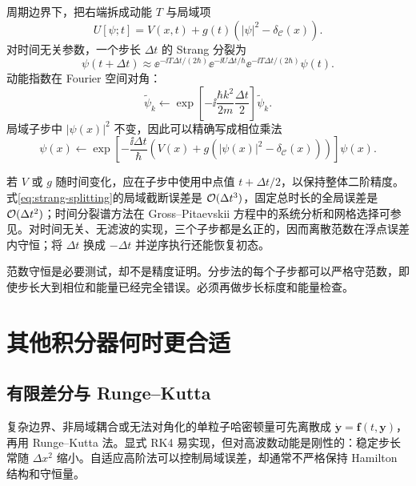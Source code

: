 周期边界下，把右端拆成动能 $T$ 与局域项
\begin{equation}
  U[\psi;t]=V(x,t)+g(t)(|\psi|^2-\delta_{\mathcal C}(x)).
\end{equation}
对时间无关参数，一个步长 $\Delta t$ 的 Strang 分裂为
\begin{equation}
  \psi(t+\Delta t)
  \approx
  \ee^{-\ii T\Delta t/(2\hbar)}
  \ee^{-\ii U\Delta t/\hbar}
  \ee^{-\ii T\Delta t/(2\hbar)}\psi(t).
  \label{eq:strang-splitting}
\end{equation}
动能指数在 Fourier 空间对角：
\begin{equation}
  \tilde\psi_k\longleftarrow
  \exp\!\left[-\ii\frac{\hbar k^2}{2m}\frac{\Delta t}{2}\right]
  \tilde\psi_k.
  \label{eq:kinetic-half-step}
\end{equation}
局域子步中 $|\psi(x)|^2$ 不变，因此可以精确写成相位乘法
\begin{equation}
  \psi(x)\longleftarrow
  \exp\!\left[-\frac{\ii\Delta t}{\hbar}
  \left(V(x)+g(|\psi(x)|^2-\delta_{\mathcal C}(x))\right)\right]\psi(x).
  \label{eq:local-nonlinear-step}
\end{equation}

若 $V$ 或 $g$ 随时间变化，应在子步中使用中点值 $t+\Delta t/2$，以保持整体二阶精度。式\eqref{eq:strang-splitting}的局域截断误差是 $\mathcal{O}(\Delta t^3)$，固定总时长的全局误差是 $\mathcal{O}(\Delta t^2)$；时间分裂谱方法在 Gross--Pitaevskii 方程中的系统分析和网格选择可参见\cite{Bao2003}。对时间无关、无滤波的实现，三个子步都是幺正的，因而离散范数在浮点误差内守恒；将 $\Delta t$ 换成 $-\Delta t$ 并逆序执行还能恢复初态。

\begin{warningbox}
范数守恒是必要测试，却不是精度证明。分步法的每个子步都可以严格守范数，即使步长大到相位和能量已经完全错误。必须再做步长标度和能量检查。
\end{warningbox}

\section{其他积分器何时更合适}

\subsection{有限差分与 Runge--Kutta}

复杂边界、非局域耦合或无法对角化的单粒子哈密顿量可先离散成
$\dot{\bm y}=\bm f(t,\bm y)$，再用 Runge--Kutta 法。显式 RK4 易实现，但对高波数动能是刚性的：稳定步长常随 $\Delta x^2$ 缩小。自适应高阶法可以控制局域误差，却通常不严格保持 Hamilton 结构和守恒量。

